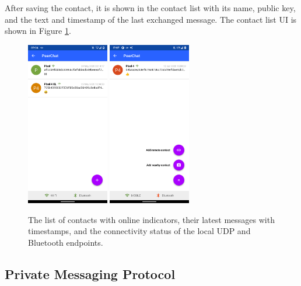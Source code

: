 After saving the contact, it is shown in the contact list with its name, public key, and the text and timestamp of the last exchanged message. The contact list UI is shown in Figure \ref{peerchat_contacts}.

\begin{figure}
    \centering
    \includegraphics[width=0.32\textwidth]{screens/superapp/contacts}
    \includegraphics[width=0.32\textwidth]{screens/superapp/contacts_menu}
    \caption{The list of contacts with online indicators, their latest messages with timestamps, and the connectivity status of the local UDP and Bluetooth endpoints.}
    \label{peerchat_contacts}
\end{figure}

\subsection{Private Messaging Protocol}

